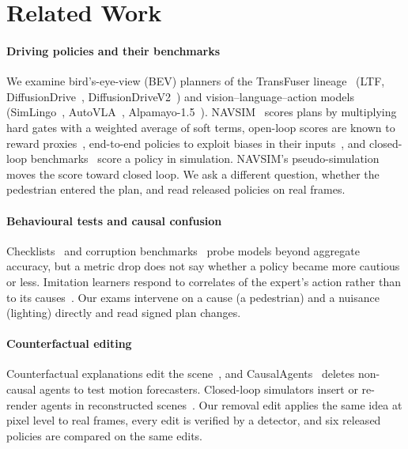 \section{Related Work}
\label{sec:related}

\paragraph{Driving policies and their benchmarks}
We examine bird's-eye-view (BEV) planners of the TransFuser lineage~\cite{chitta2023transfuser} (LTF,
DiffusionDrive~\cite{liao2025diffusiondrive}, DiffusionDriveV2~\cite{diffusiondrivev2}) and
vision--language--action models (SimLingo~\cite{renz2025simlingo}, AutoVLA~\cite{zhou2025autovla},
Alpamayo-1.5~\cite{nvidia2025alpamayo,nvidia2026alpamayo15}). NAVSIM~\cite{dauner2024navsim} scores
plans by multiplying hard gates with a weighted average of soft terms, open-loop scores are known to reward proxies~\cite{li2024egostatus}, end-to-end policies to exploit biases in their inputs~\cite{jaeger2023hidden}, and closed-loop benchmarks~\cite{jia2024bench2drive} score a policy in simulation. NAVSIM's pseudo-simulation~\cite{cao2025pseudosim} moves the score toward closed loop. We ask a different question, whether the pedestrian entered the plan, and read released policies on real frames.

\paragraph{Behavioural tests and causal confusion}
Checklists~\cite{ribeiro2020checklist} and corruption benchmarks~\cite{hendrycks2019benchmarking}
probe models beyond aggregate accuracy, but a metric drop does not say whether a policy became more
cautious or less. Imitation learners respond to correlates of the expert's action rather than to its
causes~\cite{dehaan2019causal,codevilla2019exploring,geirhos2020shortcut}. Our exams intervene on a
cause (a pedestrian) and a nuisance (lighting) directly and read signed plan changes.

\paragraph{Counterfactual editing}
Counterfactual explanations edit the scene~\cite{jacob2022steex}, and
CausalAgents~\cite{roelofs2022causalagents} deletes non-causal agents to test motion forecasters. Closed-loop simulators insert or re-render agents in reconstructed scenes~\cite{ljungbergh2024neuroncap,yang2023unisim,zhou2024hugsim}. Our removal edit applies the same idea at pixel level to real frames, every edit is verified by a detector, and six released policies are compared on the same edits.
